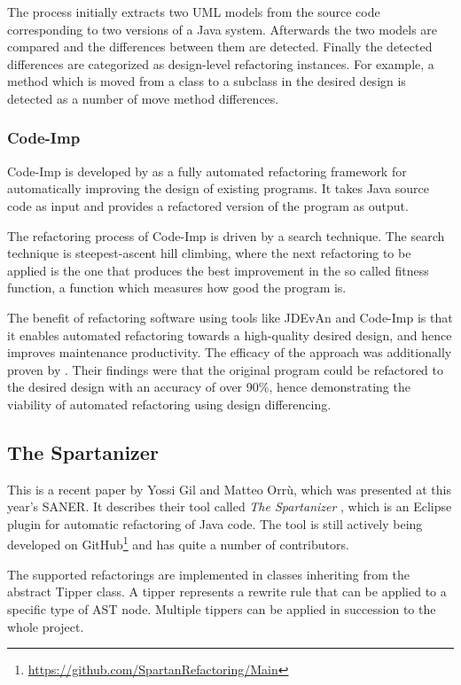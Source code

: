 \documentclass[conference,compsoc,a4paper]{IEEEtran}
\newcommand{\code}[1]{{\small\ttfamily #1}}
\newcommand{\JDEvAn}{\mbox{JDEvAn}\xspace}
\begin{document}
	The process initially extracts two UML models from the source code corresponding to two versions of a Java system. 
	Afterwards the two models are compared and the differences between them are detected. Finally the detected differences 
	are categorized as design-level refactoring instances. For example, a method which is moved from a class to a subclass
	in the desired design is detected as a number of move method differences.
	
	\subsubsection{Code-Imp}
	
	Code-Imp is developed by \cite{DBLP:journals/jss/OKeeffeC08, DBLP:conf/icse/MoghadamC11} as a fully automated 
	refactoring framework for automatically improving the design of existing programs. It takes Java source code as input 
	and provides a refactored version of the program as output.
	
	The refactoring process of Code-Imp is driven by a search technique. The search technique is steepest-ascent 
	hill climbing, where the next refactoring to be applied is the one that produces the best improvement in the so called 
	fitness function, a function which measures how good the program is.
	
	The benefit of refactoring software using tools like \JDEvAn and Code-Imp is that it enables automated refactoring 
	towards a high-quality desired design, and hence improves maintenance productivity. The efficacy of the approach was 
	additionally proven by \cite{design-diff}. Their findings were that the original program could be refactored to the 
	desired design with an accuracy of over 90\%, hence demonstrating the viability of automated refactoring using design 
	differencing.
	
	\subsection{The Spartanizer}
	
	This is a recent paper by Yossi Gil and Matteo Orrù, which was presented at this year's SANER. It describes their tool 
	called \emph{The Spartanizer} \cite{sparta}, which is an Eclipse plugin for automatic refactoring of Java code. The 
	tool is still actively being developed on GitHub\footnote{\url{https://github.com/SpartanRefactoring/Main}} and has 
	quite a number of contributors.
	
	The supported refactorings are implemented in classes inheriting from the abstract \code{Tipper} class. A tipper 
	represents a rewrite rule that can be applied to a specific type of AST node. Multiple tippers can be applied in 
	succession to the whole project.
	
\end{document}
